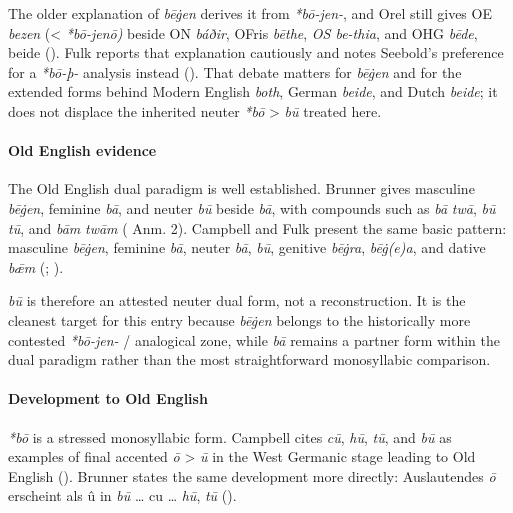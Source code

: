 \documentclass[
  british,
  a4paper,
]{article}
\begin{document}
The older explanation of \emph{bēġen} derives it from \emph{*bō-jen-},
and Orel still gives OE \emph{bezen} (\textless{} \emph{*bō-jenō)}
beside ON \emph{báðir}, OFris \emph{bēthe}, \emph{OS be-thia}, and OHG
\emph{bēde}, beide (). Fulk
reports that explanation cautiously and notes Seebold's preference for a
\emph{*bō-þ-} analysis instead (). That debate matters for \emph{bēġen} and for the extended forms
behind Modern English \emph{both}, German \emph{beide}, and Dutch
\emph{beide}; it does not displace the inherited neuter \emph{*bō}
\textgreater{} \emph{bū} treated here.

\paragraph{Old English evidence}\label{old-english-evidence-3}

The Old English dual paradigm is well established. Brunner gives
masculine \emph{bēġen}, feminine \emph{bā}, and neuter \emph{bū} beside
\emph{bā}, with compounds such as \emph{bā} \emph{twā}, \emph{bū}
\emph{tū}, and \emph{bām} \emph{twām}
( Anm. 2).
Campbell and Fulk present the same basic pattern: masculine
\emph{bēġen}, feminine \emph{bā}, neuter \emph{bā}, \emph{bū}, genitive
\emph{bēġra}, \emph{bēġ(e)a}, and dative \emph{bǣm}
(;
).

\emph{bū} is therefore an attested neuter dual form, not a
reconstruction. It is the cleanest target for this entry because
\emph{bēġen} belongs to the historically more contested \emph{*bō-jen-}
/ analogical zone, while \emph{bā} remains a partner form within the
dual paradigm rather than the most straightforward monosyllabic
comparison.

\paragraph{Development to Old
English}\label{development-to-old-english-3}

\emph{*bō} is a stressed monosyllabic form. Campbell cites \emph{cū},
\emph{hū}, \emph{tū}, and \emph{bū} as examples of final accented
\emph{ō} \textgreater{} \emph{ū} in the West Germanic stage leading to
Old English ().
Brunner states the same development more directly: Auslautendes \emph{ō}
erscheint als û in \emph{bū} \ldots{} cu \ldots{} \emph{hū}, \emph{tū}
().
\end{document}
